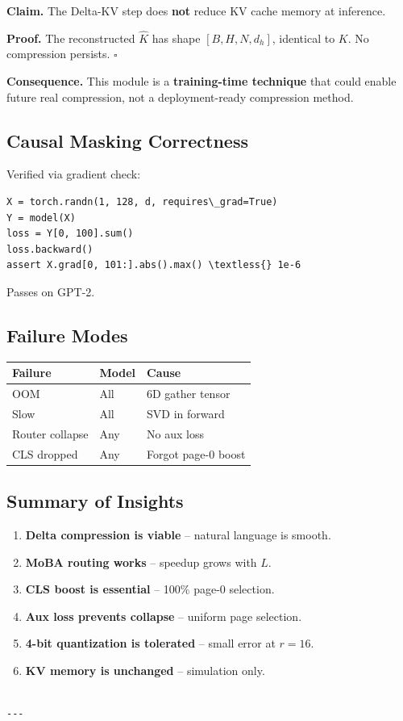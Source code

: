 \textbf{Claim.} The Delta-KV step does \textbf{not} reduce KV cache memory at inference.

\textbf{Proof.} The reconstructed $\hat{K}$ has shape $[B, H, N, d_h]$, identical 
to $K$. No compression persists. $\square$

\textbf{Consequence.} This module is a \textbf{training-time technique} that could 
enable future real compression, not a deployment-ready compression method.

\subsection{Causal Masking Correctness}

Verified via gradient check:

\begin{lstlisting}
X = torch.randn(1, 128, d, requires\_grad=True)
Y = model(X)
loss = Y[0, 100].sum()
loss.backward()
assert X.grad[0, 101:].abs().max() \textless{} 1e-6
\end{lstlisting}

Passes on GPT-2.

\subsection{Failure Modes}

\begin{table}[H]
\centering
\small
\begin{tabular}{lll}
\toprule
\textbf{Failure} & \textbf{Model} & \textbf{Cause} \\
\midrule
OOM & All & 6D gather tensor \\
Slow & All & SVD in forward \\
Router collapse & Any & No aux loss \\
CLS dropped & Any & Forgot page-0 boost \\
\bottomrule
\end{tabular}
\end{table}

\subsection{Summary of Insights}

\begin{enumerate}
\item \textbf{Delta compression is viable} -- natural language is smooth.
\item \textbf{MoBA routing works} -- speedup grows with $L$.
\item \textbf{CLS boost is essential} -- 100\% page-0 selection.
\item \textbf{Aux loss prevents collapse} -- uniform page selection.
\item \textbf{4-bit quantization is tolerated} -- small error at $r = 16$.
\item \textbf{KV memory is unchanged} -- simulation only.
\end{enumerate}
\begin{lstlisting}

---
\end{lstlisting}
